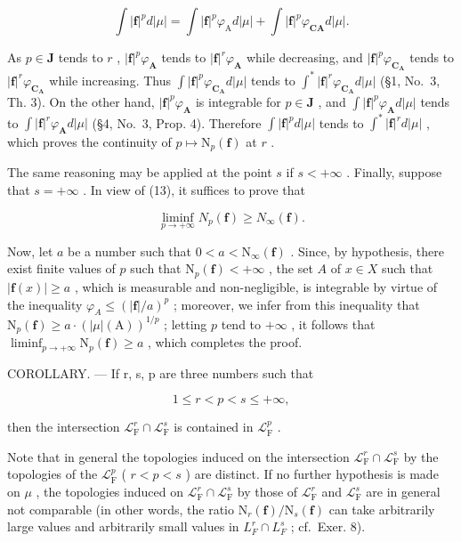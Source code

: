 \[
\int | \mathbf {f} | ^ {p} d | \mu | = \int | \mathbf {f} | ^ {p} \varphi_ {\mathrm{A}} d | \mu | + \int | \mathbf {f} | ^ {p} \varphi_ {\mathbf {C A}} d | \mu |.
\]

As \(p \in \mathbf{J}\) tends to \(r\) , \(|\mathbf{f}|^p\varphi_{\mathbf{A}}\) tends to \(|\mathbf{f}|^r\varphi_{\mathbf{A}}\) while decreasing, and \(|\mathbf{f}|^p\varphi_{\mathbf{C}_{\mathbf{A}}}\) tends to \(|\mathbf{f}|^r\varphi_{\mathbf{C}_{\mathbf{A}}}\) while increasing. Thus \(\int |\mathbf{f}|^p\varphi_{\mathbf{C}_{\mathbf{A}}}d|\mu|\) tends to \(\int^{*}|\mathbf{f}|^{r}\varphi_{\mathbf{C}_{\mathbf{A}}}d|\mu|\) (§1, No.~3, Th. 3). On the other hand, \(|\mathbf{f}|^p\varphi_{\mathbf{A}}\) is integrable for \(p \in \mathbf{J}\) , and \(\int |\mathbf{f}|^p\varphi_{\mathbf{A}}d|\mu|\) tends to \(\int |\mathbf{f}|^r\varphi_{\mathbf{A}}d|\mu|\) (§4, No.~3, Prop. 4). Therefore \(\int |\mathbf{f}|^p d|\mu|\) tends to \(\int^{*}|\mathbf{f}|^{r}d|\mu|\) , which proves the continuity of \(p \mapsto \mathrm{N}_p(\mathbf{f})\) at \(r\) .

The same reasoning may be applied at the point \(s\) if \(s < +\infty\) . Finally, suppose that \(s = +\infty\) . In view of (13), it suffices to prove that

\[
\liminf _ {p \to + \infty} N _ {p} (\mathbf {f}) \geqslant N _ {\infty} (\mathbf {f}).
\]

Now, let \(a\) be a number such that \(0 < a < \mathrm{N}_{\infty}(\mathbf{f})\) . Since, by hypothesis, there exist finite values of \(p\) such that \(\mathrm{N}_p(\mathbf{f}) < +\infty\) , the set \(A\) of \(x \in X\) such that \(|\mathbf{f}(x)| \geqslant a\) , which is measurable and non-negligible, is integrable by virtue of the inequality \(\varphi_A \leqslant (|\mathbf{f}|/a)^p\) ; moreover, we infer from this inequality that \(\mathrm{N}_p(\mathbf{f}) \geqslant a \cdot (|\mu|(\mathrm{A}))^{1/p}\) ; letting \(p\) tend to \(+\infty\) , it follows that \(\liminf_{p \to +\infty} \mathrm{N}_p(\mathbf{f}) \geqslant a\) , which completes the proof.

COROLLARY. --- If r, s, p are three numbers such that

\[
1 \leqslant r <   p <   s \leqslant + \infty ,
\]

then the intersection \(\mathcal{L}_{\mathrm{F}}^{r} \cap \mathcal{L}_{\mathrm{F}}^{s}\) is contained in \(\mathcal{L}_{\mathrm{F}}^{p}\) .

Note that in general the topologies induced on the intersection \(\mathcal{L}_{\mathrm{F}}^{r} \cap \mathcal{L}_{\mathrm{F}}^{s}\) by the topologies of the \(\mathcal{L}_{\mathrm{F}}^{p}\) ( \(r < p < s\) ) are distinct. If no further hypothesis is made on \(\mu\) , the topologies induced on \(\mathcal{L}_{\mathrm{F}}^{r} \cap \mathcal{L}_{\mathrm{F}}^{s}\) by those of \(\mathcal{L}_{\mathrm{F}}^{r}\) and \(\mathcal{L}_{\mathrm{F}}^{s}\) are in general not comparable (in other words, the ratio \(\mathrm{N}_{r}(\mathbf{f})/\mathrm{N}_{s}(\mathbf{f})\) can take arbitrarily large values and arbitrarily small values in \(L_{F}^{r} \cap L_{F}^{s}\) ; cf.~Exer. 8).

